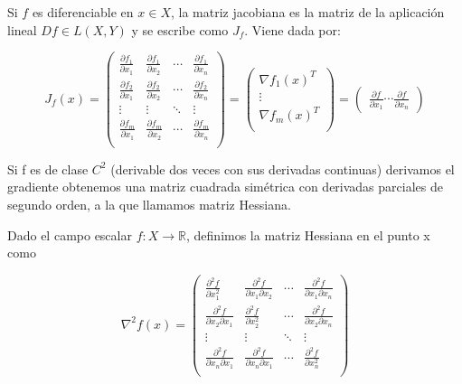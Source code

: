 \begin{definicion}
    Si $f$ es diferenciable en $ x \in X$, la matriz jacobiana es la matriz de la aplicación lineal $Df \in L \left ( X, Y \right )$ y se escribe como $J_f$. Viene dada por:

    $$J_f(x)= \begin{pmatrix}
 \frac{\partial f_1}{\partial x_1} & \frac{\partial f_1}{\partial x_2} & \cdots & \frac{\partial f_1}{\partial x_n} \\
 \frac{\partial f_2}{\partial x_1} & \frac{\partial f_2}{\partial x_2} & \cdots & \frac{\partial f_2}{\partial x_n} \\
 \vdots & \vdots & \ddots & \vdots \\
 \frac{\partial f_m}{\partial x_1} & \frac{\partial f_m}{\partial x_2} & \cdots & \frac{\partial f_m}{\partial x_n} \\
\end{pmatrix}= \begin{pmatrix}
 \nabla f_1(x)^T\\
 \vdots \\
 \nabla f_m(x)^T \\
\end{pmatrix}=
\begin{pmatrix}
     \frac{\partial f}{\partial x_1} \cdots \frac{\partial f}{\partial x_n}
\end{pmatrix}$$
\end{definicion}



Si f es de clase $C^2$ (derivable dos veces con sus derivadas continuas) derivamos el gradiente obtenemos una matriz cuadrada simétrica con derivadas parciales de segundo orden, a la que llamamos matriz Hessiana.

\begin{definicion}
	Dado el campo escalar $f: X \rightarrow \mathbb{R}$, definimos la matriz Hessiana en el punto x como

	$$\nabla^2f(x)= \begin{pmatrix}
		\frac{\partial^2f}{\partial x^{2}_1} & \frac{\partial^2f}{\partial x_1\partial x_2} & \cdots & \frac{\partial^2f}{\partial x_1 \partial x_n}\\
		\frac{\partial^2f}{\partial x_2 \partial x_1} & \frac{\partial^2f}{\partial x^{2}_2} & \cdots & \frac{\partial^2f}{\partial x_2 \partial x_n}\\
		\vdots & \vdots & \ddots & \vdots \\
		\frac{\partial^2f}{\partial x_n \partial x_1} & \frac{\partial^2f}{\partial x_n \partial x_1} & \cdots & \frac{\partial^2f}{\partial x^{2}_n}\\
	\end{pmatrix}$$

\end{definicion}

